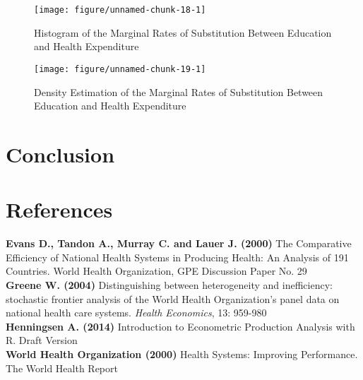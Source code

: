 \documentclass[12pt,a4paper]{article}\usepackage[]{graphicx}\usepackage[]{color}
\makeatletter
\def\maxwidth{ %
  \ifdim\Gin@nat@width>\linewidth
    \linewidth
  \else
    \Gin@nat@width
  \fi
}
\newenvironment{knitrout}{}{} %
\makeatother
\begin{document}
\begin{knitrout}
\color{fgcolor}\begin{figure}
\texttt{[image: figure/unnamed-chunk-18-1]} \caption[Histogram of the Marginal Rates of Substitution Between Education and Health Expenditure]{Histogram of the Marginal Rates of Substitution Between Education and Health Expenditure}\label{fig:unnamed-chunk-18}
\end{figure}


\end{knitrout}
\begin{knitrout}
\color{fgcolor}\begin{figure}
\texttt{[image: figure/unnamed-chunk-19-1]} \caption[Density Estimation of the Marginal Rates of Substitution Between Education and Health Expenditure]{Density Estimation of the Marginal Rates of Substitution Between Education and Health Expenditure}\label{fig:unnamed-chunk-19}
\end{figure}


\end{knitrout}

\section{Conclusion}



\newpage
\section{References}
\textbf{Evans D., Tandon A., Murray C. and Lauer J. (2000)} The Comparative Efficiency of National Health Systems in Producing Health: An Analysis of 191 Countries. World Health Organization, GPE Discussion Paper No. 29 \\

\textbf{Greene W. (2004)} Distinguishing between heterogeneity and inefficiency: stochastic frontier analysis of the World Health Organization's panel data on national health care systems. \textit{Health Economics}, 13: 959-980 \\

\textbf{Henningsen A. (2014)} Introduction to Econometric Production Analysis with R. Draft Version \\

\textbf{World Health Organization (2000)} Health Systems: Improving Performance. The World Health Report
\end{document}
